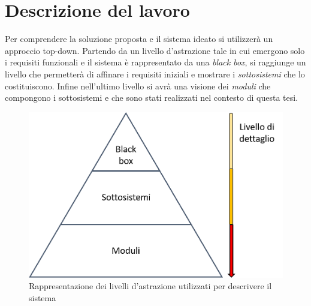 \chapter{Descrizione del lavoro}
\label{scenario}
Per comprendere la soluzione proposta e il sistema ideato si utilizzerà un approccio top-down. Partendo da un livello d'astrazione tale in cui emergono solo i requisiti funzionali e il sistema è rappresentato da una \textit{black box}, si raggiunge un livello che permetterà di affinare i requisiti iniziali e mostrare i \textit{sottosistemi} che lo costituiscono. Infine nell'ultimo livello si avrà una visione dei \textit{moduli} che compongono i sottosistemi e che sono stati realizzati nel contesto di questa tesi.
\begin{figure}[H]
	\centering
	\includegraphics[scale=0.4]{DescrizioneDelSistema/livelli_astrazione.png}
	\caption{Rappresentazione dei livelli d'astrazione utilizzati per descrivere il sistema }
	\label{fig:livelliAstrazione}
\end{figure}
\newpage

